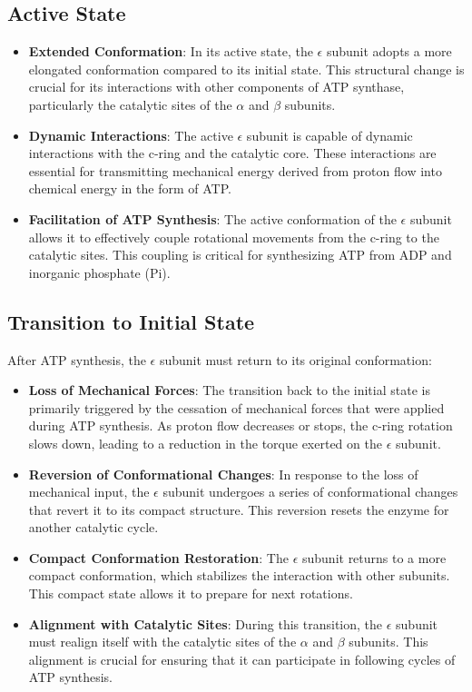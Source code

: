 \documentclass{article}
\begin{document}
\subsection{Active State}

\begin{itemize}
    \item \textbf{Extended Conformation}: In its active state, the $\epsilon$ subunit adopts a more elongated conformation compared to its initial state. This structural change is crucial for its interactions with other components of ATP synthase, particularly the catalytic sites of the $\alpha$ and $\beta$ subunits.
    \item \textbf{Dynamic Interactions}: The active $\epsilon$ subunit is capable of dynamic interactions with the c-ring and the catalytic core. These interactions are essential for transmitting mechanical energy derived from proton flow into chemical energy in the form of ATP.
    \item \textbf{Facilitation of ATP Synthesis}: The active conformation of the $\epsilon$ subunit allows it to effectively couple rotational movements from the c-ring to the catalytic sites. This coupling is critical for synthesizing ATP from ADP and inorganic phosphate (Pi).
\end{itemize}

\subsection{Transition to Initial State}

After ATP synthesis, the $\epsilon$ subunit must return to its original conformation:

\begin{itemize}
    \item  \textbf{Loss of Mechanical Forces}: The transition back to the initial state is primarily triggered by the cessation of mechanical forces that were applied during ATP synthesis. As proton flow decreases or stops, the c-ring rotation slows down, leading to a reduction in the torque exerted on the $\epsilon$ subunit.
    \item \textbf{Reversion of Conformational Changes}: In response to the loss of mechanical input, the $\epsilon$ subunit undergoes a series of conformational changes that revert it to its compact structure. This reversion resets the enzyme for another catalytic cycle.
    \item \textbf{Compact Conformation Restoration}: The $\epsilon$ subunit returns to a more compact conformation, which stabilizes the interaction with other subunits. This compact state allows it to prepare for next rotations.
    \item \textbf{Alignment with Catalytic Sites}: During this transition, the $\epsilon$ subunit must realign itself with the catalytic sites of the $\alpha$ and $\beta$ subunits. This alignment is crucial for ensuring that it can participate in following cycles of ATP synthesis.
\end{itemize}
\end{document}
